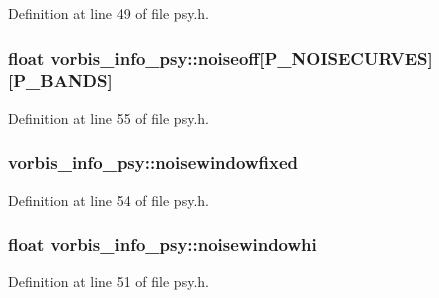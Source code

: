 Definition at line 49 of file psy.\+h.

\subsubsection[{\texorpdfstring{noiseoff}{noiseoff}}]{\setlength{\rightskip}{0pt plus 5cm}float vorbis\+\_\+info\+\_\+psy\+::noiseoff\mbox{[}{\bf P\+\_\+\+N\+O\+I\+S\+E\+C\+U\+R\+V\+ES}\mbox{]}\mbox{[}{\bf P\+\_\+\+B\+A\+N\+DS}\mbox{]}}\hypertarget{structvorbis__info__psy_aa9386a43b2fed4d8d322beeb86ca716c}{}\label{structvorbis__info__psy_aa9386a43b2fed4d8d322beeb86ca716c}


Definition at line 55 of file psy.\+h.

\subsubsection[{\texorpdfstring{noisewindowfixed}{noisewindowfixed}}]{ vorbis\+\_\+info\+\_\+psy\+::noisewindowfixed}\hypertarget{structvorbis__info__psy_a6cb2aeec6204b044c4b4279c22e22d56}{}\label{structvorbis__info__psy_a6cb2aeec6204b044c4b4279c22e22d56}


Definition at line 54 of file psy.\+h.

\subsubsection[{\texorpdfstring{noisewindowhi}{noisewindowhi}}]{\setlength{\rightskip}{0pt plus 5cm}float vorbis\+\_\+info\+\_\+psy\+::noisewindowhi}\hypertarget{structvorbis__info__psy_a8337b6979fcf921b4f975f3a88cf0394}{}\label{structvorbis__info__psy_a8337b6979fcf921b4f975f3a88cf0394}


Definition at line 51 of file psy.\+h.

